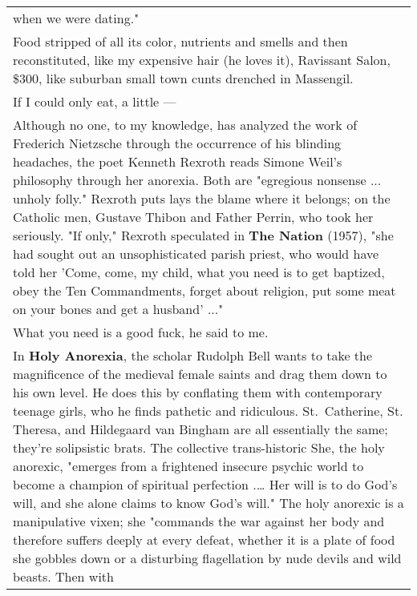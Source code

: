 \begin{longtable}[]{@{}l@{}}
\begin{minipage}[t]{0.97\columnwidth}
when we were dating."\strut
\end{minipage}\tabularnewline
\begin{minipage}[t]{0.97\columnwidth}\raggedright
Food stripped of all its color, nutrients and smells and then
reconstituted, like my expensive hair (he loves it), Ravissant Salon,
\$300, like suburban small town cunts drenched in Massengil.\strut
\end{minipage}\tabularnewline
\begin{minipage}[t]{0.97\columnwidth}\raggedright
If I could only eat, a little ---\strut
\end{minipage}\tabularnewline
\begin{minipage}[t]{0.97\columnwidth}\raggedright
Although no one, to my knowledge, has analyzed the work of Frederich
Nietzsche through the occurrence of his blinding headaches, the poet
Kenneth Rexroth reads Simone Weil's philosophy through her anorexia.
Both are "egregious nonsense ... unholy folly." Rexroth puts lays the
blame where it belongs; on the Catholic men, Gustave Thibon and Father
Perrin, who took her seriously. "If only," Rexroth speculated in
\textbf{The Nation} (1957), "she had sought out an unsophisticated
parish priest, who would have told her 'Come, come, my child, what you
need is to get baptized, obey the Ten Commandments, forget about
religion, put some meat on your bones and get a husband' ..."\strut
\end{minipage}\tabularnewline
\begin{minipage}[t]{0.97\columnwidth}\raggedright
What you need is a good fuck, he said to me.\strut
\end{minipage}\tabularnewline
\begin{minipage}[t]{0.97\columnwidth}\raggedright
In \textbf{Holy Anorexia}, the scholar Rudolph Bell wants to take the
magnificence of the medieval female saints and drag them down to his own
level. He does this by conflating them with contemporary teenage girls,
who he finds pathetic and ridiculous. St.~Catherine, St. Theresa, and
Hildegaard van Bingham are all essentially the same; they're solipsistic
brats. The collective trans-historic She, the holy anorexic, "emerges
from a frightened insecure psychic world to become a champion of
spiritual perfection .\ldots{} Her will is to do God's will, and she
alone claims to know God's will." The holy anorexic is a manipulative
vixen; she "commands the war against her body and therefore suffers
deeply at every defeat, whether it is a plate of food she gobbles down
or a disturbing flagellation by nude devils and wild beasts. Then with

\end{minipage}
\end{longtable}
